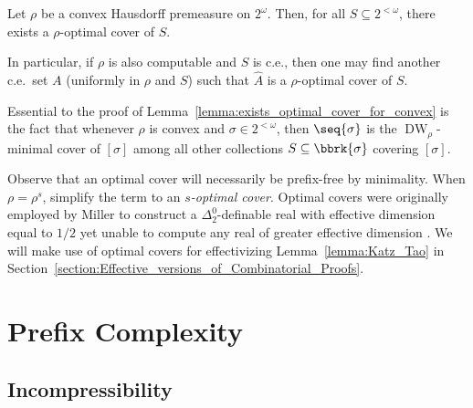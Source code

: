 \begin{lemma}
    \label{lemma:exists_optimal_cover_for_convex}
    Let $\rho$ be a convex Hausdorff premeasure on $2^\omega$. Then, for all $S \subseteq 2^{<\omega}$, there exists a $\rho$-optimal cover of $S$. 
    
    In particular, if $\rho$ is also computable and $S$ is c.e., then one may find another c.e.~set $A$ (uniformly in $\rho$ and $S$) such that $\widehat{A}$ is a $\rho$-optimal cover of $S$.
\end{lemma}

Essential to the proof of Lemma~\ref{lemma:exists_optimal_cover_for_convex} is the fact that whenever $\rho$ is convex and $\sigma \in 2^{<\omega}$, then $\seq{\sigma}$ is the $\operatorname{DW}_\rho$-minimal cover of $[\sigma]$ among all other collections $S \subseteq \bbrk{\sigma}$ covering $[\sigma]$. 

Observe that an optimal cover will necessarily be prefix-free by minimality. When $\rho = \rho^s$, simplify the term to an \textit{$s$-optimal cover}. Optimal covers were originally employed by Miller to construct a $\Delta^0_2$-definable real with effective dimension equal to $1 / 2$ yet unable to compute any real of greater effective dimension \cite{Mil11}. We will make use of optimal covers for effectivizing Lemma~\ref{lemma:Katz_Tao} in Section~\ref{section:Effective_versions_of_Combinatorial_Proofs}.

\section{Prefix Complexity} \label{section:Prefix_Comlexity}

\subsection{Incompressibility}

